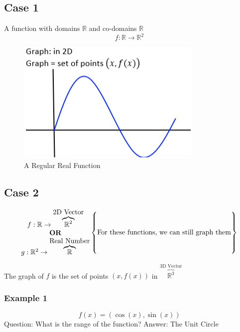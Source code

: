 \documentclass{article}
\begin{document}
\subsection*{Case 1}
A function with domains $\mathbb{R}$ and co-domains $\mathbb{R}$ 
\[f: \mathbb{R}\rightarrow\mathbb{R}^2\]
\begin{figure}[h!]
    \centering
    \includegraphics[scale=.5]{2DGraph.png}
    \caption{A Regular Real Function}
    \label{}
\end{figure}

\subsection*{Case 2}
\[\begin{matrix}
    f:\mathbb{R}\rightarrow\overbrace{\mathbb{R}^2}^{\mbox{2D Vector}}\\
    \mbox{\textbf{OR}}\\
    g:\mathbb{R}^2\rightarrow\overbrace{\mathbb{R}}^{\mbox{Real Number}}
\end{matrix}\begin{Bmatrix}
    \\
    \\
    \mbox{For these functions, we can still graph them}\\
    \\
    \\
\end{Bmatrix}\]

The graph of $f$ is the set of points $(x,f(x))$ in $\overbrace{\mathbb{R}^3}^{\mbox{3D Vector}}$

\subsubsection*{Example 1}
\[f(x)=(\cos(x),\sin(x))\]
Question: What is the range of the function?
\newline
Answer: The Unit Circle
\end{document}
